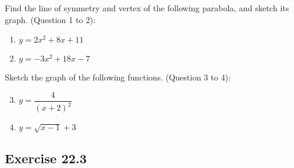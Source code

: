 \documentclass[12pt]{report}
\begin{document}
\begin{multicols}{2}

  Find the line of symmetry and vertex of the following parabola, and sketch its
  graph. (Question 1 to 2):
  \begin{enumerate}
    \item $y = 2x^2 + 8x + 11$
    \item $y = -3x^2 + 18x - 7$
  \end{enumerate}

  Sketch the graph of the following functions. (Question 3 to 4):
  \begin{enumerate}
    \setcounter{enumi}{2}
    \item $y = \dfrac{4}{{(x+2)}^2}$
    \item $y = \sqrt{x - 1} + 3$
  \end{enumerate}

\end{multicols}

\setlength{\columnseprule}{1pt}
\setlength{\columnsep}{24pt}

\subsection*{Exercise 22.3}
\end{document}
